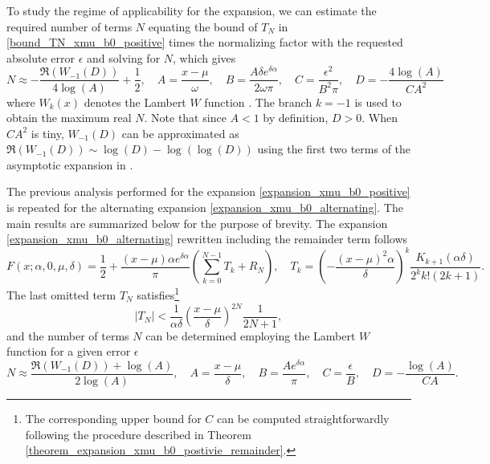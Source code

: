 \documentclass[10pt,a4paper,oneside]{article}
\numberwithin{equation}{section}
\begin{document}
To study the regime of applicability for the expansion, we can estimate the required number of terms $N$ equating the bound of $T_N$ in \eqref{bound_TN_xmu_b0_positive} times the normalizing factor with the requested absolute error $\epsilon$ and solving for $N$, which gives
\begin{equation}\label{N_expansion_xmu_b0_positive}
N \approx -\frac{\Re(W_{-1}(D))}{4 \log(A)} + \frac{1}{2}, \quad A = \frac{x-\mu}{\omega}, \quad B = \frac{A\delta e^{\delta \alpha}}{2\omega\pi}, \quad C = \frac{\epsilon^2}{B^2 \pi}, \quad D = -\frac{4 \log(A)}{C A^2}
\end{equation}
where $W_k(x)$ denotes the Lambert $W$ function \cite[\S 4.13]{NIST:DLMF}. The branch $k=-1$ is used to obtain the maximum real $N$. Note that since $A < 1$ by definition, $D > 0$. When $C A^2$ is tiny, $W_{-1}(D)$ can be approximated as $\Re(W_{-1}(D)) \sim \log(D) - \log(\log(D))$ using the first two terms of the asymptotic expansion in \cite[\S 4.13.10]{NIST:DLMF}.

The previous analysis performed for the expansion \eqref{expansion_xmu_b0_positive} is repeated for the alternating expansion \eqref{expansion_xmu_b0_alternating}. The main results are summarized below for the purpose of brevity. The expansion \eqref{expansion_xmu_b0_alternating} rewritten including the remainder term follows
\begin{equation}
F(x; \alpha, 0, \mu, \delta) = \frac{1}{2} + \frac{(x-\mu)\alpha e^{\delta \alpha}}{\pi} \left( \sum_{k=0}^{N-1} T_k + R_N\right),  \quad T_k = \left(-\frac{(x-\mu)^2 \alpha}{\delta}\right)^k \frac{K_{k+1}(\alpha \delta)}{2^k k! (2k + 1)}.
\end{equation}
The last omitted term $T_N$ satisfies\footnote{The corresponding upper bound for $C$ can be computed straightforwardly following the procedure described in Theorem \ref{theorem_expansion_xmu_b0_postivie_remainder}.}
\begin{equation}
|T_N| < \frac{1}{\alpha \delta} \left(\frac{x-\mu}{\delta}\right)^{2N} \frac{1}{2N + 1},
\end{equation} 
and the number of terms $N$ can be determined employing the Lambert $W$ function for a given error $\epsilon$
\begin{equation}
N \approx \frac{\Re(W_{-1}(D)) + \log(A)}{2 \log(A)}, \quad A = \frac{x-\mu}{\delta}, \quad B = \frac{A e^{\delta \alpha}}{\pi}, \quad C = \frac{\epsilon}{B}, \quad D = -\frac{\log(A)}{CA}.
\end{equation}
\end{document}
